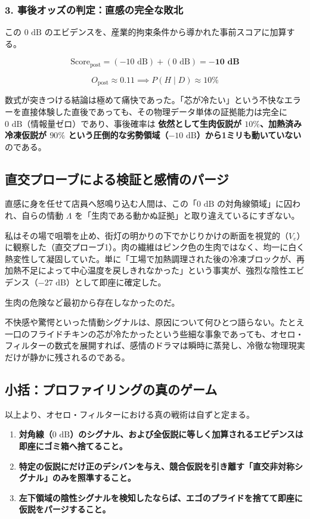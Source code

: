 \subsubsection{3. 事後オッズの判定：直感の完全な敗北}

この $0\text{ dB}$ のエビデンスを、産業的拘束条件から導かれた事前スコアに加算する。

\begin{equation}
\text{Score}_{\mathrm{post}} = (-10\text{ dB}) + (0\text{ dB}) = \mathbf{-10\text{ dB}}
\end{equation}

\begin{equation}
O_{\mathrm{post}} \approx 0.11 \implies P(H \mid D) \approx 10\%
\end{equation}

数式が突きつける結論は極めて痛快であった。「芯が冷たい」という不快なエラーを直接体験した直後であっても、その物理データ単体の証拠能力は完全に $0\text{ dB}$（情報量ゼロ）であり、事後確率は \textbf{依然として生肉仮説が $10\%$、加熱済み冷凍仮説が $90\%$ という圧倒的な劣勢領域（$-10\text{ dB}$）から1ミリも動いていない} のである。

\subsection{直交プローブによる検証と感情のパージ}

直感に身を任せて店員へ怒鳴り込む人間は、この「$0\text{ dB}$ の対角線領域」に囚われ、自らの情動 $\Lambda$ を「生肉である動かぬ証拠」と取り違えているにすぎない。

私はその場で咀嚼を止め、街灯の明かりの下でかじりかけの断面を視覚的（$V_e$）に観察した（直交プローブ1）。肉の繊維はピンク色の生肉ではなく、均一に白く熱変性して凝固していた。単に「工場で加熱調理された後の冷凍ブロックが、再加熱不足によって中心温度を戻しきれなかった」という事実が、強烈な陰性エビデンス（$-27\text{ dB}$）として即座に確定した。

生肉の危険など最初から存在しなかったのだ。

不快感や驚愕といった情動シグナルは、原因について何ひとつ語らない。たとえ一口のフライドチキンの芯が冷たかったという些細な事象であっても、オセロ・フィルターの数式を展開すれば、感情のドラマは瞬時に蒸発し、冷徹な物理現実だけが静かに残されるのである。

\subsection{小括：プロファイリングの真のゲーム}
以上より、オセロ・フィルターにおける真の戦術は自ずと定まる。
\begin{enumerate}[label=(\arabic*)]
\item \textbf{対角線（$0\text{ dB}$）のシグナル、および全仮説に等しく加算されるエビデンスは即座にゴミ箱へ捨てること。}
\item \textbf{特定の仮説にだけ正のデシバンを与え、競合仮説を引き離す「直交非対称シグナル」のみを照準すること。}
\item \textbf{左下領域の陰性シグナルを検知したならば、エゴのプライドを捨てて即座に仮説をパージすること。}
\end{enumerate}

